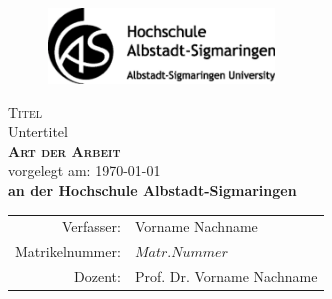 	\begin{titlepage}
		\renewcommand{\baselinestretch}{1}
		\begin{figure}[htbp]
			\centering
			\includegraphics[width=6cm]{./abbildungen/Logo}
			\label{fig:Logo}
		\end{figure}
		\vspace*{2cm}
		\begin{center}
			\huge \textsf{\textsc{Titel} \\
				{\Large Untertitel}} \\
			\vspace{2cm}
			\LARGE\textbf{\textsc{Art der Arbeit}}\\
			\vspace{0.5cm}
			\normalsize
			vorgelegt am: \today \\
			\vspace{1cm}
			\large \textbf{an der Hochschule Albstadt-Sigmaringen}\\
			\vspace*{\fill}
		\end{center}
		\normalsize{
			\begin{tabular}{rl}
				Verfasser: & {Vorname Nachname} \\
				Matrikelnummer: & $ Matr.Nummer $\\
				Dozent: & {Prof. Dr. Vorname Nachname} \\
			\end{tabular}\\
		}
	\end{titlepage}
